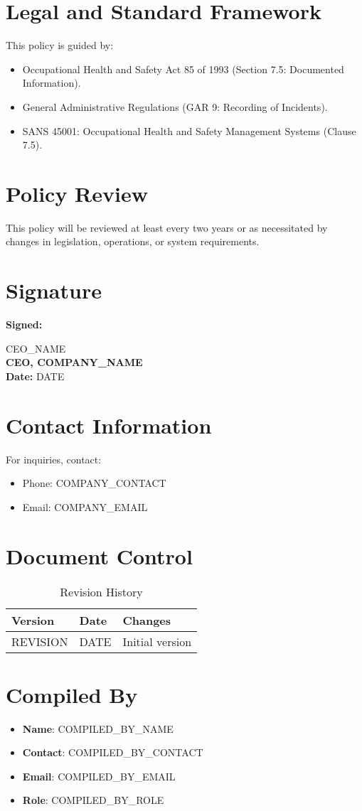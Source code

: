 \documentclass[12pt]{article}
\begin{document}
\section{Legal and Standard Framework}
This policy is guided by:
\begin{itemize}
    \item Occupational Health and Safety Act 85 of 1993 (Section 7.5: Documented Information).
    \item General Administrative Regulations (GAR 9: Recording of Incidents).
    \item SANS 45001: Occupational Health and Safety Management Systems (Clause 7.5).
\end{itemize}

\section{Policy Review}
This policy will be reviewed at least every two years or as necessitated by changes in legislation, operations, or system requirements.

\section{Signature}
\textbf{Signed:}

{{CEO_NAME}}\\
\textbf{CEO, {{COMPANY_NAME}}}\\
\textbf{Date:} {{DATE}}

\section{Contact Information}
For inquiries, contact:
\begin{itemize}
    \item Phone: {{COMPANY_CONTACT}}
    \item Email: {{COMPANY_EMAIL}}
\end{itemize}

\section{Document Control}
\begin{table}[h]
    \centering
    \begin{tabular}{p{3cm}p{3cm}p{6cm}}
        \toprule
        \textbf{Version} & \textbf{Date} & \textbf{Changes} \\
        \midrule
        {{REVISION}} & {{DATE}} & Initial version \\
        \bottomrule
    \end{tabular}
    \caption{Revision History}
\end{table}

\section{Compiled By}
\begin{itemize}
    \item \textbf{Name}: {{COMPILED_BY_NAME}}
    \item \textbf{Contact}: {{COMPILED_BY_CONTACT}}
    \item \textbf{Email}: {{COMPILED_BY_EMAIL}}
    \item \textbf{Role}: {{COMPILED_BY_ROLE}}
\end{itemize}
\end{document}
